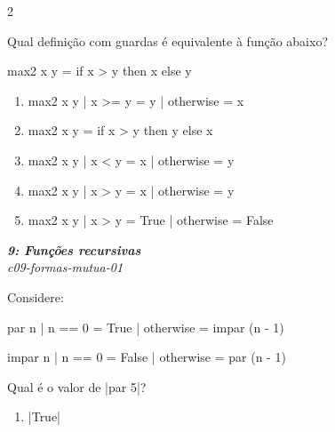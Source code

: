 \documentclass[a4paper,10pt,brazil]{article}
\begin{document}
\begin{multicols}{2}
\begin{flushright}
\end{flushright}
Qual definição com guardas é equivalente à função abaixo?
\begin{haskellcode}
max2 x y = if x > y then x else y
\end{haskellcode}

\begin{enumerate}
  \item \begin{haskellcode}
max2 x y
  | x >= y    = y
  | otherwise = x
\end{haskellcode}

  \item \begin{haskellcode}
max2 x y = if x > y then y else x
\end{haskellcode}

  \item \begin{haskellcode}
max2 x y
  | x < y     = x
  | otherwise = y
\end{haskellcode}

  \item \begin{haskellcode}
max2 x y
  | x > y     = x
  | otherwise = y
\end{haskellcode}

  \item \begin{haskellcode}
max2 x y
  | x > y     = True
  | otherwise = False
\end{haskellcode}


\end{enumerate}

\begin{flushright}
  \footnotesize
  \textit{\textbf{9: Funções recursivas}}\\
  \textit{c09-formas-mutua-01}\\

\end{flushright}
Considere:
\begin{haskellcode}
par n | n == 0 = True
      | otherwise = impar (n - 1)

impar n | n == 0 = False
        | otherwise = par (n - 1)
\end{haskellcode}
Qual é o valor de \haskellinline|par 5|?

\begin{enumerate}
  \item \haskellinline|True|


\end{enumerate}
\end{multicols}
\end{document}
